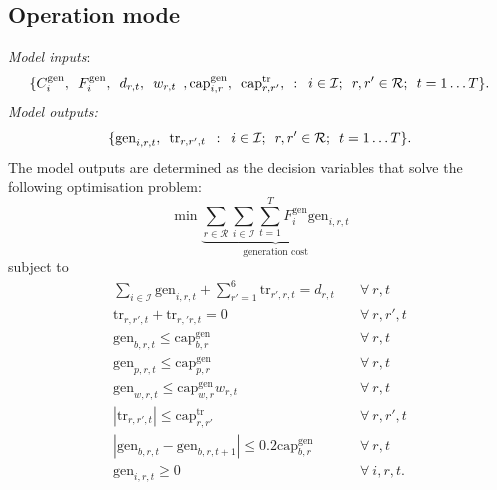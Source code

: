 \documentclass[preprint]{elsarticle}
\begin{document}
\subsection{Operation mode}
\label{sec:appendix:optimisation:model_4}
\noindent \textit{Model inputs}:
\begin{equation}
  \{C_{i}^\text{gen}, \hspace{0.5em} F_{i}^\text{gen}, \hspace{0.5em} d_{r, t}, \hspace{0.5em} w_{r, t} \hspace{0.5em}, \text{cap}_{i,r}^\text{gen}, \hspace{0.5em} \text{cap}_{r,r'}^\text{tr}, \hspace{0.5em} : \hspace{0.5em} i \in \mathcal{I}; \hspace{0.5em} r,r' \in \mathcal{R}; \hspace{0.5em} t = 1 \ldots T\}.
\label{eq:model_4:inputs}
\end{equation}
\textit{Model outputs:}
\begin{equation}
\{\text{gen}_{i,r,t}, \hspace{0.5em} \text{tr}_{r,r',t} \hspace{0.5em} : \hspace{0.5em} i \in \mathcal{I}; \hspace{0.5em} r,r' \in \mathcal{R}; \hspace{0.5em} t = 1 \ldots T\}.
\label{eq:model_4:decision_variables}
\end{equation}
The model outputs are determined as the decision variables that solve the following optimisation problem:
\begin{equation}
\min \underbrace{ \sum_{r \in \mathcal{R}} \sum_{i \in \mathcal{I}} \sum_{t=1}^{T} F_i^\text{gen} \text{gen}_{i,r,t}}_\text{generation cost}
\label{eq:model_4:objective}
\end{equation}
\noindent subject to
\begin{align}
\sum_{i \in \mathcal{I}} \text{gen}_{i,r,t} + \sum_{r'=1}^6 \text{tr}_{r',r,t} = d_{r,t} \quad & \forall \: r, t \label{eq:model_4:demand_met} \\
\text{tr}_{r,r',t} + \text{tr}_{r,'r,t} = 0 \quad & \forall \: r, r', t \label{eq:model_4:tr_balance} \\
\text{gen}_{b,r,t} \le \text{cap}_{b,r}^\text{gen} \quad & \forall \: r, t \label{eq:model_4:gen_le_cap_b} \\
\text{gen}_{p,r,t} \le \text{cap}_{p,r}^\text{gen} \quad & \forall \: r, t \label{eq:model_4:gen_le_cap_p} \\
\text{gen}_{w,r,t} \le \text{cap}_{w,r}^\text{gen} w_{r,t} \quad & \forall \: r, t \label{eq:model_4:gen_le_cap_w} \\
|\text{tr}_{r,r',t}| \le \text{cap}_{r,r'}^\text{tr} \quad & \forall \: r, r', t \label{eq:model_4:tr_le_cap_tr} \\
|\text{gen}_{b,r,t} - \text{gen}_{b,r,t+1}| \le 0.2 \text{cap}_{b,r}^\text{gen} \quad & \forall \: r, t \label{eq:model_4:ramping} \\
\text{gen}_{i,r,t} \ge 0 \quad & \forall \: i, r, t. \label{eq:model_4:ge_0}
\end{align}
\end{document}
